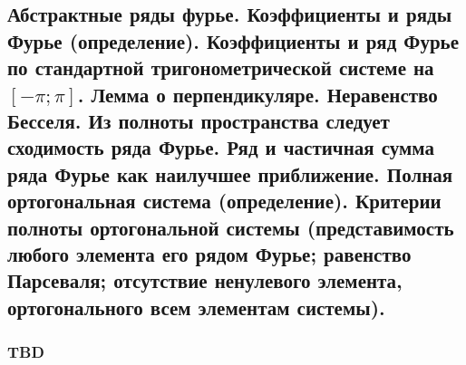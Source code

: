 \subsection{Абстрактные ряды фурье. Коэффициенты и ряды Фурье (определение). Коэффициенты и ряд Фурье по стандартной тригонометрической системе на $[-\pi; \pi]$. Лемма о перпендикуляре. Неравенство Бесселя. Из полноты пространства следует сходимость ряда Фурье. Ряд и частичная сумма ряда Фурье как наилучшее приближение. Полная ортогональная система (определение). Критерии полноты ортогональной системы (представимость любого элемента его рядом Фурье; равенство Парсеваля; отсутствие ненулевого элемента, ортогонального всем элементам системы).}

\subsubsection{TBD}